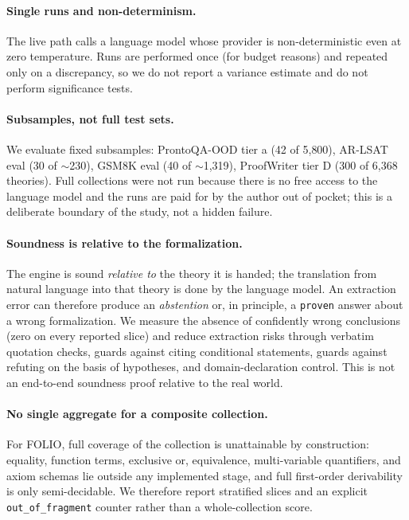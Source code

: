 \documentclass[11pt,a4paper]{article}
\begin{document}
\paragraph{Single runs and non-determinism.} The live path calls a language model whose
provider is non-deterministic even at zero temperature. Runs are performed once (for budget
reasons) and repeated only on a discrepancy, so we do not report a variance estimate and do
not perform significance tests.

\paragraph{Subsamples, not full test sets.} We evaluate fixed subsamples: ProntoQA-OOD tier
a (42 of 5{,}800), AR-LSAT eval (30 of $\sim$230), GSM8K eval (40 of $\sim$1{,}319),
ProofWriter tier D (300 of 6{,}368 theories). Full collections were not run because there is
no free access to the language model and the runs are paid for by the author out of pocket;
this is a deliberate boundary of the study, not a hidden failure.

\paragraph{Soundness is relative to the formalization.} The engine is sound \emph{relative
to} the theory it is handed; the translation from natural language into that theory is done
by the language model. An extraction error can therefore produce an \emph{abstention} or, in
principle, a \texttt{proven} answer about a wrong formalization. We measure the absence of
confidently wrong conclusions (zero on every reported slice) and reduce extraction risks
through verbatim quotation checks, guards against citing conditional statements, guards
against refuting on the basis of hypotheses, and domain-declaration control. This is not an
end-to-end soundness proof relative to the real world.

\paragraph{No single aggregate for a composite collection.} For FOLIO, full coverage of the
collection is unattainable by construction: equality, function terms, exclusive or,
equivalence, multi-variable quantifiers, and axiom schemas lie outside any implemented
stage, and full first-order derivability is only semi-decidable. We therefore report
stratified slices and an explicit \texttt{out\_of\_fragment} counter rather than a
whole-collection score.
\end{document}
